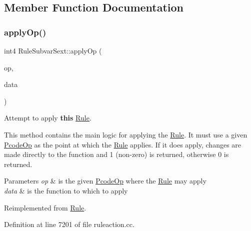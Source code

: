 \subsection{Member Function Documentation}
\mbox{\label{class_rule_subvar_sext_a77ff5f0a097fc96ad1a34fea4eae3821}} 
\subsubsection{\texorpdfstring{applyOp()}{applyOp()}}
{\footnotesize\ttfamily int4 Rule\+Subvar\+Sext\+::apply\+Op (\begin{DoxyParamCaption}\item[{\mbox{\hyperlink{class_pcode_op}{Pcode\+Op}} $\ast$}]{op,  }\item[{\mbox{\hyperlink{class_funcdata}{Funcdata}} \&}]{data }\end{DoxyParamCaption})\hspace{0.3cm}{\ttfamily [virtual]}}



Attempt to apply {\bfseries{this}} \mbox{\hyperlink{class_rule}{Rule}}. 

This method contains the main logic for applying the \mbox{\hyperlink{class_rule}{Rule}}. It must use a given \mbox{\hyperlink{class_pcode_op}{Pcode\+Op}} as the point at which the \mbox{\hyperlink{class_rule}{Rule}} applies. If it does apply, changes are made directly to the function and 1 (non-\/zero) is returned, otherwise 0 is returned. 
\begin{DoxyParams}{Parameters}
{\em op} & is the given \mbox{\hyperlink{class_pcode_op}{Pcode\+Op}} where the \mbox{\hyperlink{class_rule}{Rule}} may apply \\
\hline
{\em data} & is the function to which to apply \\
\hline
\end{DoxyParams}


Reimplemented from \mbox{\hyperlink{class_rule_a4e3e61f066670175009f60fb9dc60848}{Rule}}.



Definition at line 7201 of file ruleaction.\+cc.

